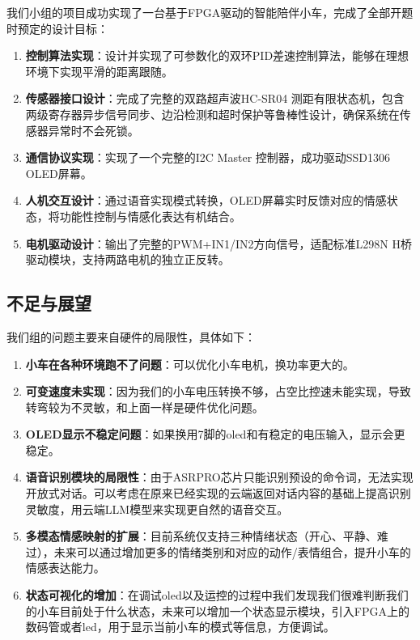 \documentclass[12pt,a4paper]{ctexart}
\begin{document}
我们小组的项目成功实现了一台基于FPGA驱动的智能陪伴小车，完成了全部开题时预定的设计目标：

\begin{enumerate}[label=(\arabic*)]
    \item \textbf{控制算法实现}：设计并实现了可参数化的双环PID差速控制算法，能够在理想环境下实现平滑的距离跟随。
    \item \textbf{传感器接口设计}：完成了完整的双路超声波HC-SR04 测距有限状态机，包含两级寄存器异步信号同步、边沿检测和超时保护等鲁棒性设计，确保系统在传感器异常时不会死锁。
    \item \textbf{通信协议实现}：实现了一个完整的I2C Master 控制器，成功驱动SSD1306 OLED屏幕。
    \item \textbf{人机交互设计}：通过语音实现模式转换，OLED屏幕实时反馈对应的情感状态，将功能性控制与情感化表达有机结合。
    \item \textbf{电机驱动设计}：输出了完整的PWM+IN1/IN2方向信号，适配标准L298N H桥驱动模块，支持两路电机的独立正反转。
\end{enumerate}



\subsection{不足与展望}
我们组的问题主要来自硬件的局限性，具体如下：
\begin{enumerate}[label=(\arabic*)]
    \item \textbf{小车在各种环境跑不了问题}：可以优化小车电机，换功率更大的。
    \item \textbf{可变速度未实现}：因为我们的小车电压转换不够，占空比控速未能实现，导致转弯较为不灵敏，和上面一样是硬件优化问题。
    \item \textbf{OLED显示不稳定问题}：如果换用7脚的oled和有稳定的电压输入，显示会更稳定。
    \item \textbf{语音识别模块的局限性}：由于ASRPRO芯片只能识别预设的命令词，无法实现开放式对话。可以考虑在原来已经实现的云端返回对话内容的基础上提高识别灵敏度，用云端LLM模型来实现更自然的语音交互。
    \item \textbf{多模态情感映射的扩展}：目前系统仅支持三种情绪状态（开心、平静、难过），未来可以通过增加更多的情绪类别和对应的动作/表情组合，提升小车的情感表达能力。  
    \item \textbf{状态可视化的增加}：在调试oled以及运控的过程中我们发现我们很难判断我们的小车目前处于什么状态，未来可以增加一个状态显示模块，引入FPGA上的数码管或者led，用于显示当前小车的模式等信息，方便调试。
\end{enumerate}
\end{document}
